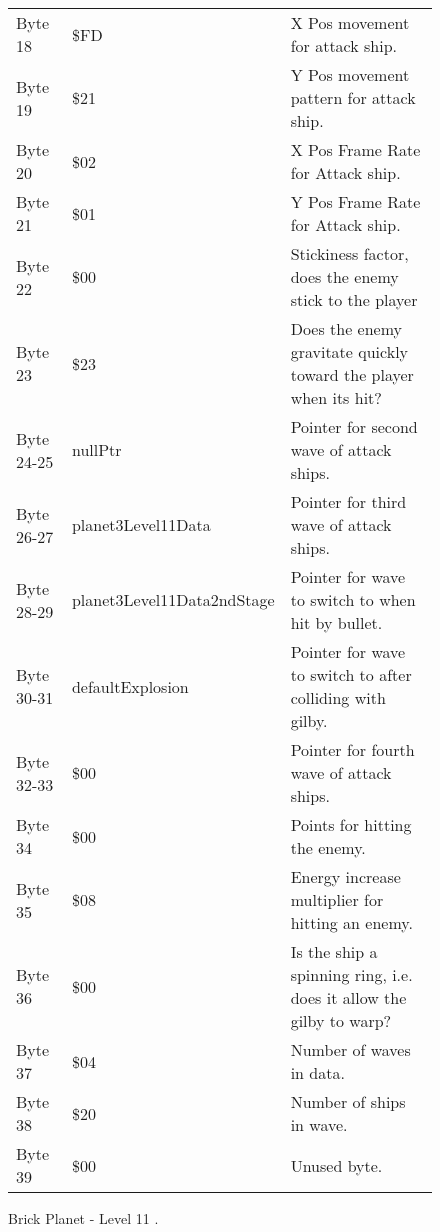 \begin{figure}[H]
{\begin{adjustbox}{width=12cm}
\begin{tabular}{lll}
 Byte 18    & \$FD                        & X Pos movement for attack ship.                                     \\
 Byte 19    & \$21                        & Y Pos movement pattern for attack ship.                             \\
 Byte 20    & \$02                        & X Pos Frame Rate for Attack ship.                                   \\
 Byte 21    & \$01                        & Y Pos Frame Rate for Attack ship.                                   \\
 Byte 22    & \$00                        & Stickiness factor, does the enemy stick to the player               \\
 Byte 23    & \$23                        & Does the enemy gravitate quickly toward the player when its hit?    \\
 Byte 24-25 & nullPtr                    & Pointer for second wave of attack ships.                            \\
 Byte 26-27 & planet3Level11Data         & Pointer for third wave of attack ships.                             \\
 Byte 28-29 & planet3Level11Data2ndStage & Pointer for wave to switch to when hit by bullet.                   \\
 Byte 30-31 & defaultExplosion           & Pointer for  wave to switch to after colliding with gilby.          \\
 Byte 32-33 & \$00                        & Pointer for fourth wave of attack ships.                            \\
 Byte 34    & \$00                        & Points for hitting the enemy.                                       \\
 Byte 35    & \$08                        & Energy increase multiplier for hitting an enemy.                    \\
 Byte 36    & \$00                        & Is the ship a spinning ring, i.e. does it allow the gilby to warp?  \\
 Byte 37    & \$04                        & Number of waves in data.                                            \\
 Byte 38    & \$20                        & Number of ships in wave.                                            \\
 Byte 39    & \$00                        & Unused byte.                                                        \\
\bottomrule
\end{tabular}

  \end{adjustbox}

  }\caption*{Brick Planet - Level 11
.}
\end{figure}

